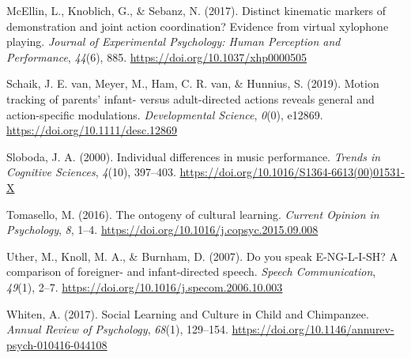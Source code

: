 \documentclass[
  english,
  man,floatsintext]{apa6}
\newlength{\cslhangindent}
\newenvironment{cslreferences}%
  {\setlength{\parindent}{0pt}%
  \everypar{\setlength{\hangindent}{\cslhangindent}}\ignorespaces}%
  {\par}
\begin{document}
\begin{cslreferences}
\leavevmode\hypertarget{ref-mcellin_2017}{}%
McEllin, L., Knoblich, G., \& Sebanz, N. (2017). Distinct kinematic markers of demonstration and joint action coordination? Evidence from virtual xylophone playing. \emph{Journal of Experimental Psychology: Human Perception and Performance}, \emph{44}(6), 885. \url{https://doi.org/10.1037/xhp0000505}

\leavevmode\hypertarget{ref-schaik_2019}{}%
Schaik, J. E. van, Meyer, M., Ham, C. R. van, \& Hunnius, S. (2019). Motion tracking of parents' infant- versus adult-directed actions reveals general and action-specific modulations. \emph{Developmental Science}, \emph{0}(0), e12869. \url{https://doi.org/10.1111/desc.12869}

\leavevmode\hypertarget{ref-sloboda_2000}{}%
Sloboda, J. A. (2000). Individual differences in music performance. \emph{Trends in Cognitive Sciences}, \emph{4}(10), 397--403. \url{https://doi.org/10.1016/S1364-6613(00)01531-X}

\leavevmode\hypertarget{ref-tomasello_2016}{}%
Tomasello, M. (2016). The ontogeny of cultural learning. \emph{Current Opinion in Psychology}, \emph{8}, 1--4. \url{https://doi.org/10.1016/j.copsyc.2015.09.008}

\leavevmode\hypertarget{ref-uther_2007}{}%
Uther, M., Knoll, M. A., \& Burnham, D. (2007). Do you speak E-NG-L-I-SH? A comparison of foreigner- and infant-directed speech. \emph{Speech Communication}, \emph{49}(1), 2--7. \url{https://doi.org/10.1016/j.specom.2006.10.003}

\leavevmode\hypertarget{ref-whiten_2017}{}%
Whiten, A. (2017). Social Learning and Culture in Child and Chimpanzee. \emph{Annual Review of Psychology}, \emph{68}(1), 129--154. \url{https://doi.org/10.1146/annurev-psych-010416-044108}
\end{cslreferences}

\endgroup
\raggedbottom
\end{document}
